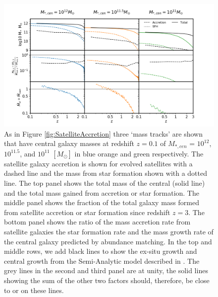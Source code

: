 \begin{figure}
    \centering
    \includegraphics[width = \linewidth]{Appendices/StellarMassAssembly/SatelliteAccretion_Menci.png}
    \caption{As in Figure \ref{fig:SatelliteAccretion} three `mass tracks' are shown that have central galaxy masses at redshift $z = 0.1$ of $M_{*,cen}$ = $10^{12}$, $10^{11.5}$, and $10^{11}$ $[M_{\odot}]$ in blue orange and green respectively. The satellite galaxy accretion is shown for evolved satellites with a dashed line and the mass from star formation shown with a dotted line. The top panel shows the total mass of the central (solid line) and the total mass gained from accretion or star formation. The middle panel shows the fraction of the total galaxy mass formed from satellite accretion or star formation since redshift $z=3$. The bottom panel shows the ratio of the mass accretion rate from satellite galaxies the star formation rate and the mass growth rate of the central galaxy predicted by abundance matching. In the top and middle rows, we add black lines to show the ex-situ growth and central growth from the Semi-Analytic model described in \citet{Menci2014TriggeringInteractions}. The grey lines in the second and third panel are at unity, the solid lines showing the sum of the other two factors should, therefore, be close to or on these lines.}
    \label{fig:SatelliteAccretion_Menci}
\end{figure}